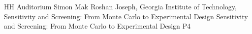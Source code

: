 {HH Auditorium}	%
{Simon Mak}		%
{Roshan Joseph, Georgia Institute of Technology, Sensitivity and Screening: From Monte Carlo to Experimental Design}	%
{Sensitivity and Screening: From Monte Carlo to Experimental Design}		%
{P4}		%
\\\hline
